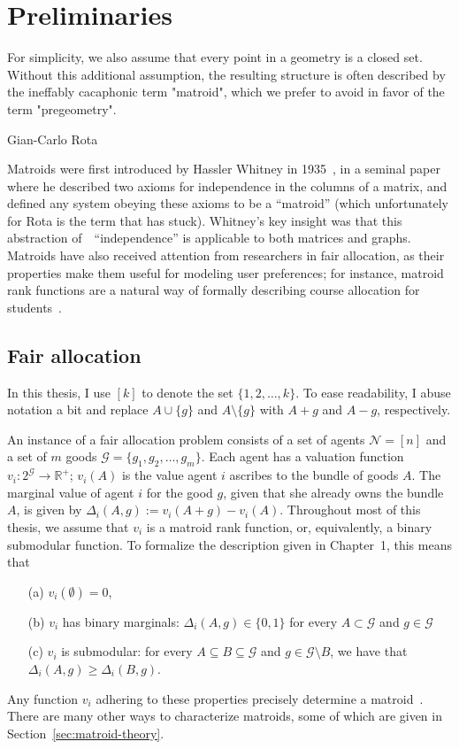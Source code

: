 \chapter{Preliminaries}
\label{chap:prelims}
\epigraph{For simplicity, we also assume that every point in a geometry is a closed set. Without this additional assumption, the resulting structure is often described by the ineffably cacaphonic term "matroid", which we prefer to avoid in favor of the term "pregeometry".}{Gian-Carlo Rota \cite{crapo_rota_1970}}
\label{sec:matroid-theory}

Matroids were first introduced by Hassler Whitney in 1935~\cite{whitney-1935}, in a seminal paper where he described two axioms for independence in the columns of a matrix, and defined any system obeying these axioms to be a ``matroid'' (which unfortunately for Rota is the term that has stuck). Whitney's key insight was that this abstraction of~~``independence'' is applicable to both matrices and graphs. Matroids have also received attention from researchers in fair allocation, as their properties make them useful for modeling user preferences; for instance, matroid rank functions are a natural way of formally describing course allocation for students~\cite{benabbou-2021}. 

\section{Fair allocation}
In this thesis, I use $[k]$ to denote the set $\{1,2,\dots,k\}$. To ease readability, I abuse notation a bit and replace $A \cup \{g\}$ and $A \setminus \{g\}$ with $A+g$ and $A-g$, respectively.

An instance of a fair allocation problem consists of a set of agents $\mathcal{N} = [n]$ and a set of $m$ goods $\mathcal{G} = \{g_1, g_2, \dots, g_m\}$. Each agent has a valuation function $v_i: 2^\mathcal{G} \to \mathbb{R}^+$; $v_i(A)$ is the value agent $i$ ascribes to the bundle of goods $A$. The marginal value of agent $i$ for the good $g$, given that she already owns the bundle $A$, is given by $\Delta_i(A, g) := v_i(A + g) - v_i(A)$. Throughout most of this thesis, we assume that $v_i$ is a matroid rank function, or, equivalently, a binary submodular function. To formalize the description given in Chapter~1, this means that
\begin{enumerate}
  \item[(a)] $v_i(\emptyset) = 0$,
  \item[(b)] $v_i$ has binary marginals: $\Delta_i(A, g)\in \{0,1\}$ for every $A \subset \mathcal{G}$ and $g\in \mathcal{G}$
  \item[(c)] $v_i$ is submodular: for every $A\subseteq B\subseteq \mathcal{G}$ and $g\in \mathcal{G}\setminus B$, we have that $\Delta_i(A, g) \geq \Delta_i(B, g)$.
\end{enumerate}
Any function $v_i$ adhering to these properties precisely determine a matroid~\cite{schrijver-2003}. There are many other ways to characterize matroids, some of which are given in Section~\ref{sec:matroid-theory}.


